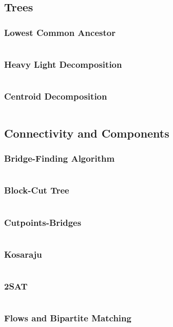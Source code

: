 \documentclass[a4paper, 8pt, landscape, oneside]{extarticle}
\begin{document}
\begin{multicols*}{3}
   		\subsection{Trees}
    		\subsubsection{Lowest Common Ancestor}
    		\inputminted{cpp}{src/graph/lca.cpp}
    		\subsubsection{Heavy Light Decomposition}
    		\inputminted{cpp}{src/graph/hld.cpp}
    		\subsubsection{Centroid Decomposition}
    		\inputminted{cpp}{src/graph/old_centroid-decomposition.cpp}
    	\subsection{Connectivity and Components}
    		\subsubsection{Bridge-Finding Algorithm}
    		\inputminted{cpp}{src/graph/old_bridgealgo.cpp}
    		\subsubsection{Block-Cut Tree}
    		\inputminted{cpp}{src/graph/old_block-cut-tree.cpp}
    		\subsubsection{Cutpoints-Bridges}
    		\inputminted{cpp}{src/graph/old_cutpoints-bridges.cpp}
    		\subsubsection{Kosaraju}
    		\inputminted{cpp}{src/graph/old_kosaraju.cpp}
    		\subsubsection{2SAT}
    		\inputminted{cpp}{src/graph/old_2SAT.cpp}
    	\subsubsection{Flows and Bipartite Matching}

\end{multicols*}
\end{document}
